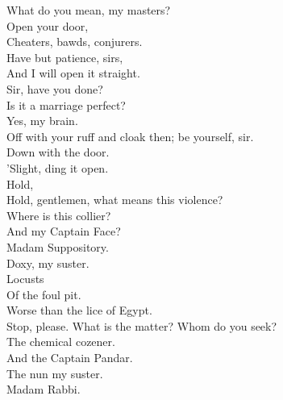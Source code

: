 \documentclass[a4paper,oneside,12pt]{memoir}
\begin{document}
\begin{drama*}
\lovewitspeaks What do you mean, my masters?\\
\mammonspeaks {} Open your door,\\
Cheaters, bawds, conjurers.\\
\lovewitspeaks {} Have but patience, sirs,\\
And I will open it straight.\\
\facespeaks {} Sir, have you done?\\
Is it a marriage perfect?\\
\lovewitspeaks {} Yes, my brain.\\
\facespeaks Off with your ruff and cloak then; be yourself, sir.\\
\surlyspeaks Down with the door.\\
\kastrilspeaks {} 'Slight, ding it open.\\
\lovewitspeaks {} Hold,\\
Hold, gentlemen, what means this violence?\\
\mammonspeaks Where is this collier?\\
\surlyspeaks {} And my Captain Face?\\
\mammonspeaks Madam Suppository.\\
\kastrilspeaks {} Doxy, my suster.\\
\persecutionspeaks {} Locusts\\
Of the foul pit.\\
\tribulationspeaks {} Worse than the lice of Egypt.\\
\lovewitspeaks Stop, please. What is the matter? Whom do you seek?\\
\mammonspeaks The chemical cozener.\\
\surlyspeaks {} And the Captain Pandar.\\
\kastrilspeaks The nun my suster.\\
\mammonspeaks {} Madam Rabbi.\\

\end{drama*}
\end{document}

